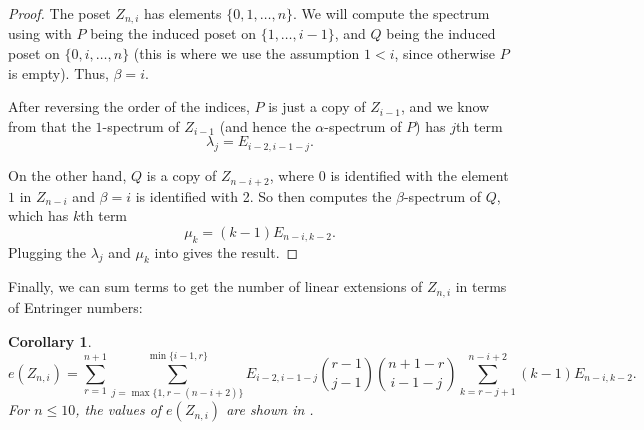 \documentclass{article}
\newtheorem{corollary}[theorem]{Corollary}
\theoremstyle{definition}
\newcommand{\ent}[2]{E_{#1,#2}}
\begin{document}
\begin{proof}
	The poset $Z_{n,i}$ has elements $\{0,1,\dots , n\}$. We will compute the spectrum using  with $P$ being the induced poset on $\{1, \dots , i-1\}$, and $Q$ being the induced poset on $\{0,i,\dots , n\}$ (this is where we use the assumption $1 < i$, since otherwise $P$ is empty). Thus, $\beta = i$.
	
	After reversing the order of the indices, $P$ is just a copy of $Z_{i-1}$, and we know from  that the $1$-spectrum of $Z_{i-1}$ (and hence the $\alpha$-spectrum of $P$) has $j$th term
	\[
		\lambda_j = \ent{i-2}{i-1-j}.
	\]
	
	On the other hand, $Q$ is a copy of $Z_{n-i+2}$, where $0$ is identified with the element $1$ in $Z_{n-i}$ and $\beta=i$ is identified with 2. So then  computes the $\beta$-spectrum of $Q$, which has $k$th term
	\[
		\mu_k = (k-1)\ent{n-i}{k-2}.
	\]
	Plugging the $\lambda_j$ and $\mu_k$ into  gives the result.
\end{proof}

Finally, we can sum terms to get the number of linear extensions of $Z_{n,i}$ in terms of Entringer numbers:

\begin{corollary}\label{cor:e(Z_{n,i})}
	\[
		e(Z_{n,i}) = \sum_{r=1}^{n+1}\sum_{j=\max\{1,r-(n-i+2)\}}^{\min\{i-1,r\}} \ent{i-2}{i-1-j} \binom{r-1}{j-1}\binom{n+1-r}{i-1-j}\sum_{k = r-j+1}^{n-i+2}(k-1)\ent{n-i}{k-2}.
	\]
	For $n \leq 10$, the values of $e(Z_{n,i})$ are shown in .
\end{corollary}
\end{document}

